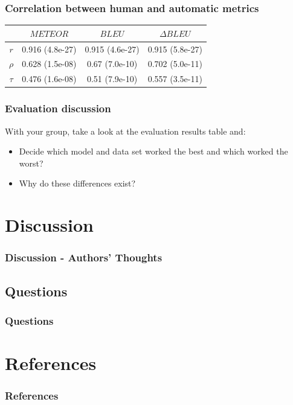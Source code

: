 \documentclass[xcolor=dvipsnames]{beamer}
\begin{document}
		\begin{frame}
			\frametitle{Correlation between human and automatic metrics} 
			\begin{tabular}{cccc} \toprule
				& $METEOR$ & $BLEU$ & $\Delta BLEU$ \\ \midrule

				$r$ & 0.916 (4.8e-27) & 0.915 (4.6e-27) & 0.915 (5.8e-27) \\ 

				$\rho$ & 0.628 (1.5e-08) & 0.67 (7.0e-10) & 0.702 (5.0e-11) \\ 

				$\tau$ & 0.476 (1.6e-08) & 0.51 (7.9e-10)  & 0.557 (3.5e-11) \\ \bottomrule

			\end{tabular} 
		\end{frame}
	
		\begin{frame}
			\frametitle{Evaluation discussion}
			With your group, take a look at the evaluation results table and:
			\begin{itemize}
				\item<1-> Decide which model and data set worked the best and which worked the worst?
				\item<2-> Why do these differences exist?
				
			\end{itemize}
		\end{frame}	
	\section{Discussion}
		
		\begin{frame}
			\frametitle{Discussion - Authors' Thoughts}
			
		\end{frame}
	
		\subsection{Questions}
			
			\begin{frame}
				\frametitle{Questions}
				
			\end{frame}
	
	
	\section{References}
		
		\begin{frame}[allowframebreaks]
			\frametitle{References}
			\begin{footnotesize}
				
				
			\end{footnotesize}
		\end{frame}

		
	
\end{document}
